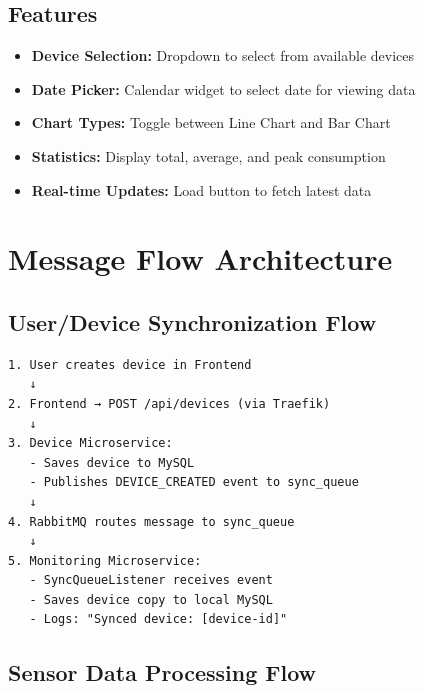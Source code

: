 \documentclass[12pt,a4paper]{article}
\begin{document}
\subsection{Features}

\begin{itemize}
    \item \textbf{Device Selection:} Dropdown to select from available devices
    \item \textbf{Date Picker:} Calendar widget to select date for viewing data
    \item \textbf{Chart Types:} Toggle between Line Chart and Bar Chart
    \item \textbf{Statistics:} Display total, average, and peak consumption
    \item \textbf{Real-time Updates:} Load button to fetch latest data
\end{itemize}

\newpage

\section{Message Flow Architecture}

\subsection{User/Device Synchronization Flow}

\begin{verbatim}
1. User creates device in Frontend
   ↓
2. Frontend → POST /api/devices (via Traefik)
   ↓
3. Device Microservice:
   - Saves device to MySQL
   - Publishes DEVICE_CREATED event to sync_queue
   ↓
4. RabbitMQ routes message to sync_queue
   ↓
5. Monitoring Microservice:
   - SyncQueueListener receives event
   - Saves device copy to local MySQL
   - Logs: "Synced device: [device-id]"
\end{verbatim}

\subsection{Sensor Data Processing Flow}
\end{document}
